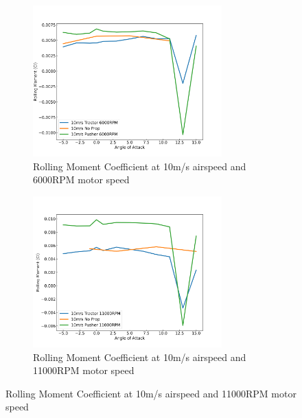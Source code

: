 \begin{figure}[H]
    \centering
    \begin{subfigure}[b]{0.467\textwidth}
        \centering
        \includegraphics[width=0.8\textwidth]{05_Results/Figs/Cl_roll/10ms_6000RPM_Cl_roll.png}
        \caption{Rolling Moment Coefficient at 10m/s airspeed and 6000RPM motor speed}
        \label{fig:Cl_roll_10ms_6000}
    \end{subfigure}
    \begin{subfigure}[b]{0.467\textwidth}
        \centering
        \includegraphics[width=0.8\textwidth]{05_Results/Figs/Cl_roll/10ms_11000RPM_Cl.png}
        \caption{Rolling Moment Coefficient at 10m/s airspeed and 11000RPM motor speed}
        \label{fig:Cl_roll_10ms_11000}
    \end{subfigure}
\end{figure}

